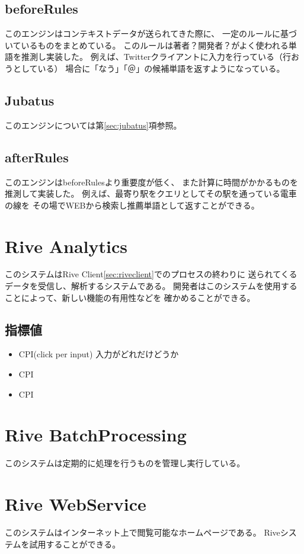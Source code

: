 \subsection{beforeRules}
このエンジンはコンテキストデータが送られてきた際に、
一定のルールに基づいているものをまとめている。
このルールは著者？開発者？がよく使われる単語を推測し実装した。
例えば、Twitter\cite{twitter}クライアントに入力を行っている（行おうとしている）
場合に「なう」「＠」の候補単語を返すようになっている。

\subsection{Jubatus}
このエンジンについては第\ref{sec:jubatus}項参照。

\subsection{afterRules}
このエンジンはbeforeRulesより重要度が低く、
また計算に時間がかかるものを推測して実装した。
例えば、最寄り駅をクエリとしてその駅を通っている電車の線を
その場でWEBから検索し推薦単語として返すことができる。

\section{Rive Analytics}
このシステムはRive Client\ref{sec:riveclient}でのプロセスの終わりに
送られてくるデータを受信し、解析するシステムである。
開発者はこのシステムを使用することによって、新しい機能の有用性などを
確かめることができる。

\subsection{指標値}
\begin{itemize}
  \item CPI(click per input)
    入力がどれだけどうか
  \item CPI
  \item CPI
\end{itemize}

\section{Rive BatchProcessing}
このシステムは定期的に処理を行うものを管理し実行している。

\section{Rive WebService}
このシステムはインターネット上で閲覧可能なホームページである。
Riveシステムを試用することができる。

